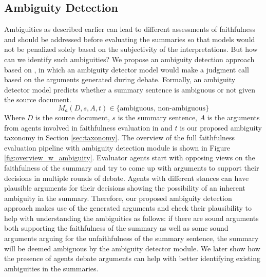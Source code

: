 \subsection{Ambiguity Detection}
Ambiguities as described earlier can lead to different assessments of faithfulness and should be addressed before evaluating the summaries so that models would not be penalized solely based on the subjectivity of the interpretations.
But how can we identify such ambiguities?
We propose an ambiguity detection approach based on \method, in which an ambiguity detector model would make a judgment call based on the arguments generated during debate. 
Formally, an ambiguity detector model predicts whether a summary sentence is ambiguous or not given the source document.
\[M_{a}(D,s,A,t) \in \text{\{ambiguous, non-ambiguous\}}\]
%
Where $D$ is the source document, $s$ is the summary sentence, $A$ is the arguments from agents involved in faithfulness evaluation in \method and $t$ is our proposed ambiguity taxonomy in Section \ref{sec:taxonomy}.
% 
The overview of the full faithfulness evaluation pipeline with ambiguity detection module is shown in Figure \ref{fig:overview_w_ambiguity}. 
%
Evaluator agents start with opposing views on the faithfulness of the summary and try to come up with arguments to support their decisions in multiple rounds of debate. Agents with different stances can have plausible arguments for their decisions showing the possibility of an inherent ambiguity in the summary. Therefore, our proposed ambiguity detection approach makes use of the generated arguments and check their plausibility to help with understanding the ambiguities as follows: if there are sound arguments both supporting the faithfulness of the summary as well as some sound arguments arguing for the unfaithfulness of the summary sentence, the summary will be deemed ambiguous by the ambiguity detector module.
% 
We later show how the presence of agents debate arguments can help with better identifying existing ambiguities in the summaries.

